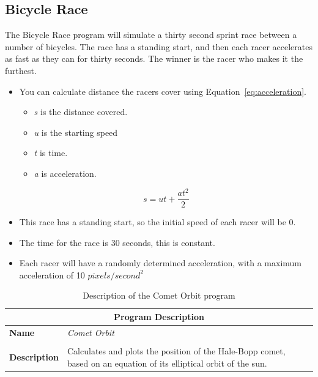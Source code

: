 

\clearpage
\subsection{Bicycle Race} %
\label{sub:bicycle_race}

The Bicycle Race program will simulate a thirty second sprint race between a number of bicycles. The race has a standing start, and then each racer accelerates as fast as they can for thirty seconds. The winner is the racer who makes it the furthest.

\begin{itemize}
  \item You can calculate distance the racers cover using Equation~\ref{eq:acceleration}.
  \begin{itemize}
    \item \emph{s} is the distance covered.
    \item \emph{u} is the starting speed
    \item \emph{t} is time.
    \item \emph{a} is acceleration.
  \end{itemize} 
  \begin{equation}
    s = ut + \frac{a t^2}{2}
    \label{eq:acceleration}
  \end{equation}
  \item This race has a standing start, so the initial speed of each racer will be 0.
  \item The time for the race is 30 seconds, this is constant.
  \item Each racer will have a randomly determined acceleration, with a maximum acceleration of 10 $pixels/second^2$
\end{itemize}




\begin{table}[h]
\centering
\begin{tabular}{l|p{10cm}}
  \hline
  \multicolumn{2}{c}{\textbf{Program Description}} \\
  \hline
  \textbf{Name} & \emph{Comet Orbit} \\
  \\
  \textbf{Description} & Calculates and plots the position of the Hale-Bopp comet, based on an equation of its elliptical orbit of the sun. \\
  \hline
\end{tabular}
\caption{Description of the Comet Orbit program}
\label{tbl:data-comet-orbit}
\end{table}

